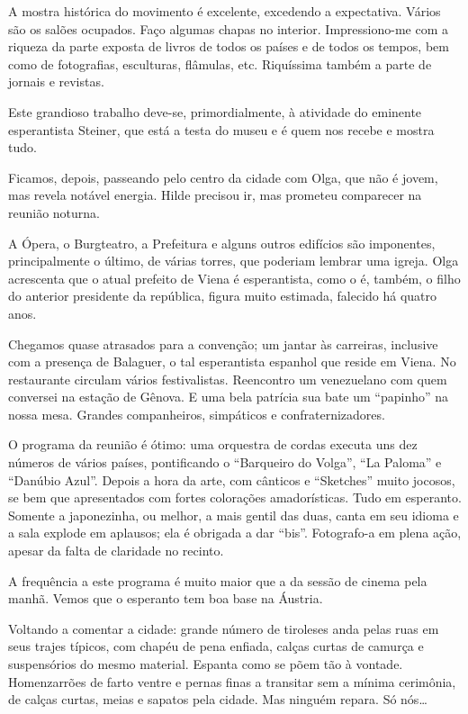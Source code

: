 A mostra histórica do movimento é excelente, excedendo a expectativa. Vários são os salões ocupados. Faço algumas chapas no interior. Impressiono-me com a riqueza da parte exposta de livros de todos os países e de todos os tempos, bem como de fotografias, esculturas, flâmulas, etc. Riquíssima também a parte de jornais e revistas.

Este grandioso trabalho deve-se, primordialmente, à atividade do eminente esperantista Steiner, que está a testa do museu e é quem nos recebe e mostra tudo.

Ficamos, depois, passeando pelo centro da cidade com Olga, que não é jovem, mas revela notável energia. Hilde precisou ir, mas prometeu comparecer na reunião noturna.

A Ópera, o Burgteatro, a Prefeitura e alguns outros edifícios são imponentes, principalmente o último, de várias torres, que poderiam lembrar uma igreja. Olga acrescenta que o atual prefeito de Viena é esperantista, como o é, também, o filho do anterior presidente da república, figura muito estimada, falecido há quatro anos.

Chegamos quase atrasados para a convenção; um jantar às carreiras, inclusive com a presença de Balaguer, o tal esperantista espanhol que reside em Viena. No restaurante circulam vários festivalistas. Reencontro um venezuelano com quem conversei na estação de Gênova. E uma bela patrícia sua bate um ``papinho'' na nossa mesa. Grandes companheiros, simpáticos e confraternizadores.

O programa da reunião é ótimo: uma orquestra de cordas executa uns dez números de vários países, pontificando o ``Barqueiro do Volga'', ``La Paloma'' e ``Danúbio Azul''. Depois a hora da arte, com cânticos e ``Sketches'' muito jocosos, se bem que apresentados com fortes colorações amadorísticas. Tudo em esperanto. Somente a japonezinha, ou melhor, a mais gentil das duas, canta em seu idioma e a sala explode em aplausos; ela é obrigada a dar ``bis''. Fotografo-a em plena ação, apesar da falta de claridade no recinto.

A frequência a este programa é muito maior que a da sessão de cinema pela manhã. Vemos que o esperanto tem boa base na Áustria.

Voltando a comentar a cidade: grande número de tiroleses anda pelas ruas em seus trajes típicos, com chapéu de pena enfiada, calças curtas de camurça e suspensórios do mesmo material. Espanta como se põem tão à vontade. Homenzarrões de farto ventre e pernas finas a transitar sem a mínima cerimônia, de calças curtas, meias e sapatos pela cidade. Mas ninguém repara. Só nós\ldots

